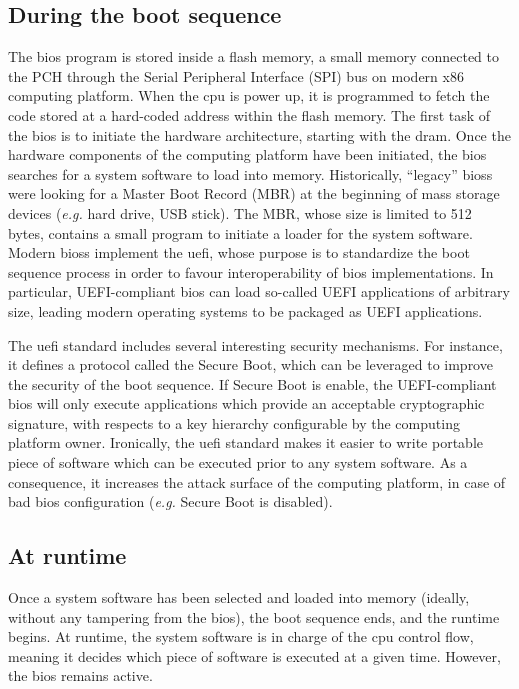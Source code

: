 \subsection{During the boot sequence}
\label{subsec:usecase:firm:boot}

The \ac{bios} program is stored inside a flash memory, a small memory connected
to the PCH through the Serial Peripheral Interface (SPI) bus on modern x86
computing platform.
%
When the \ac{cpu} is power up, it is programmed to fetch the code stored at a
hard-coded address within the flash memory.
%
The first task of the \ac{bios} is to initiate the hardware architecture,
starting with the \ac{dram}.
%
Once the hardware components of the computing platform have been initiated, the
\ac{bios} searches for a system software to load into memory.
%
Historically, ``legacy'' \acp{bios} were looking for a Master Boot Record (MBR)
at the beginning of mass storage devices (\emph{e.g.} hard drive, USB stick).
%
The MBR, whose size is limited to 512 bytes, contains a small program to
initiate a loader for the system software.
%
Modern \acp{bios} implement the \ac{uefi}, whose purpose is to standardize the
boot sequence process in order to favour interoperability of \ac{bios}
implementations.
%
In particular, UEFI-compliant \ac{bios} can load so-called UEFI applications of
arbitrary size, leading modern operating systems to be packaged as UEFI
applications.

The \ac{uefi} standard includes several interesting security mechanisms.
%
For instance, it defines a protocol called the Secure Boot, which can be
leveraged to improve the security of the boot sequence.
%
If Secure Boot is enable, the UEFI-compliant \ac{bios} will only execute
applications which provide an acceptable cryptographic signature, with respects
to a key hierarchy configurable by the computing platform owner.
%
Ironically, the \ac{uefi} standard makes it easier to write portable piece of
software which can be executed prior to any system software.
%
As a consequence, it increases the attack surface of the computing platform, in
case of bad \ac{bios} configuration (\emph{e.g.} Secure Boot is disabled).

\subsection{At runtime}
\label{subsec:usecase:firm:runtime}

Once a system software has been selected and loaded into memory (ideally,
without any tampering from the \ac{bios}), the boot sequence ends, and the
runtime begins.
%
At runtime, the system software is in charge of the \ac{cpu} control flow,
meaning it decides which piece of software is executed at a given time.
%
However, the \ac{bios} remains active.

